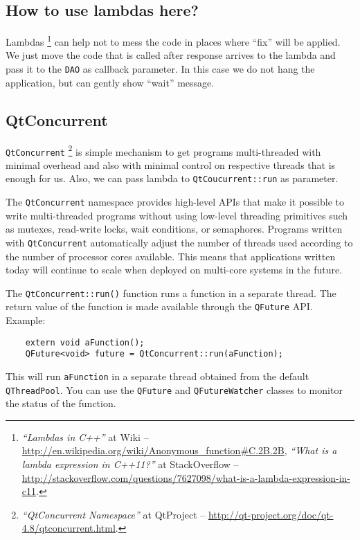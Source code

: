 \documentclass[a4paper,12pt]{scrartcl}
\begin{document}
\subsection{How to use lambdas here?}

Lambdas%
\footnote{\textit{``Lambdas in C++''} at Wiki --
\url{http://en.wikipedia.org/wiki/Anonymous\_function\#C.2B.2B},
\textit{``What is a lambda expression in C++11?''} at StackOverflow --
\url{http://stackoverflow.com/questions/7627098/what-is-a-lambda-expression-in-c11}.}
can help not to mess the code in places where ``fix'' will be applied. We just move the code that is called 
after response arrives to the lambda and pass it to the \texttt{DAO} as callback parameter. In this case we 
do not hang the application, but can gently show ``wait'' message.


\subsection{QtConcurrent}
\texttt{QtConcurrent}%
\footnote{\textit{``QtConcurrent Namespace''} at QtProject -- \url{http://qt-project.org/doc/qt-4.8/qtconcurrent.html}.}
is simple mechanism to get programs multi-threaded with minimal overhead and also with minimal control on 
respective threads that is enough for us. Also, we can pass lambda to \texttt{QtCoucurrent::run} as parameter.

The \texttt{QtConcurrent} namespace provides high-level APIs that make it possible to write multi-threaded 
programs without using low-level threading primitives such as mutexes, read-write locks, wait conditions, or 
semaphores. Programs written with \texttt{QtConcurrent} automatically adjust the number of threads used 
according to the number of processor cores available. This means that applications written today will continue 
to scale when deployed on multi-core systems in the future.

The \texttt{QtConcurrent::run()} function runs a function in a separate thread. The return value of the function 
is made available through the \texttt{QFuture} API.
Example:

\begin{verbatim}
    extern void aFunction();
    QFuture<void> future = QtConcurrent::run(aFunction);
\end{verbatim}
    
This will run \texttt{aFunction} in a separate thread obtained from the default \texttt{QThreadPool}. You can use the 
\texttt{QFuture} and \texttt{QFutureWatcher} classes to monitor the status of the function.
\end{document}

